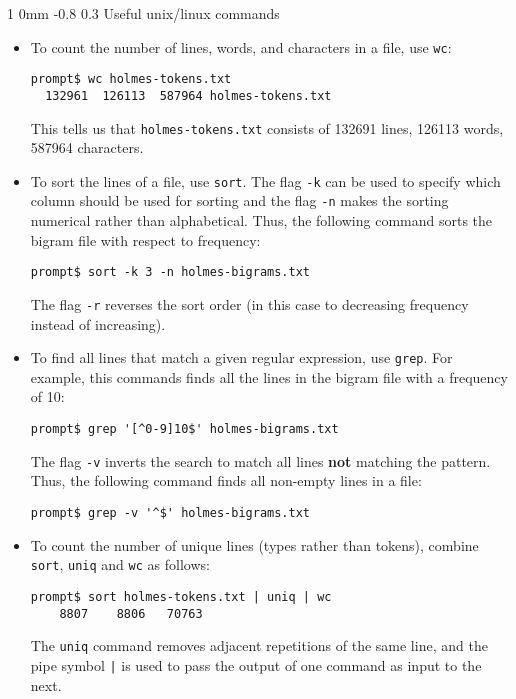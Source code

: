 \documentclass[11pt]{article}
\makeatletter
\newcommand{\newsec}[2]{\section{#1}\label{sec:#2}\noindent}
\renewcommand{\section}{\@startsection
{section}%
{1}%
{0mm}%
{-0.8\baselineskip}%
{0.3\baselineskip}%
{\bfseries\large}}%
\makeatother
\begin{document}
\appendix
\newsec{Useful unix/linux commands}{unix}%
\begin{itemize}
\item To count the number of lines, words, and characters in a file,
  use {\tt wc}:
\begin{verbatim}
prompt$ wc holmes-tokens.txt
  132961  126113  587964 holmes-tokens.txt
\end{verbatim}
This tells us that {\tt holmes-tokens.txt} consists of 132691 lines, 126113 words, 587964 characters. 

\item To sort the lines of a file, use {\tt sort}. The flag {\tt -k} can be used to specify which column should be used 
for sorting and the flag {\tt -n} makes the sorting numerical rather than alphabetical. 
Thus, the following command sorts the bigram file with respect to frequency:
\begin{verbatim}
prompt$ sort -k 3 -n holmes-bigrams.txt
\end{verbatim}
The flag {\tt -r} reverses the sort order (in this case to decreasing frequency instead of increasing).
\item To find all lines that match a given regular expression, use {\tt grep}. For example, this commands finds all the lines
in the bigram file with a frequency of 10:
\begin{verbatim}
prompt$ grep '[^0-9]10$' holmes-bigrams.txt
\end{verbatim}
The flag {\tt -v} inverts the search to match all lines \textbf{not} matching the pattern. Thus, the following command
finds all non-empty lines in a file:
\begin{verbatim}
prompt$ grep -v '^$' holmes-bigrams.txt
\end{verbatim}
\item To count the number of unique lines (types rather than tokens), combine {\tt sort}, {\tt uniq} and {\tt wc} as follows:
\begin{verbatim}
prompt$ sort holmes-tokens.txt | uniq | wc
    8807    8806   70763
\end{verbatim}
The {\tt uniq} command removes adjacent repetitions of the same line, and the pipe symbol {\tt |} is used to 
pass the output of one command as input to the next.
\end{itemize}
\end{document}
